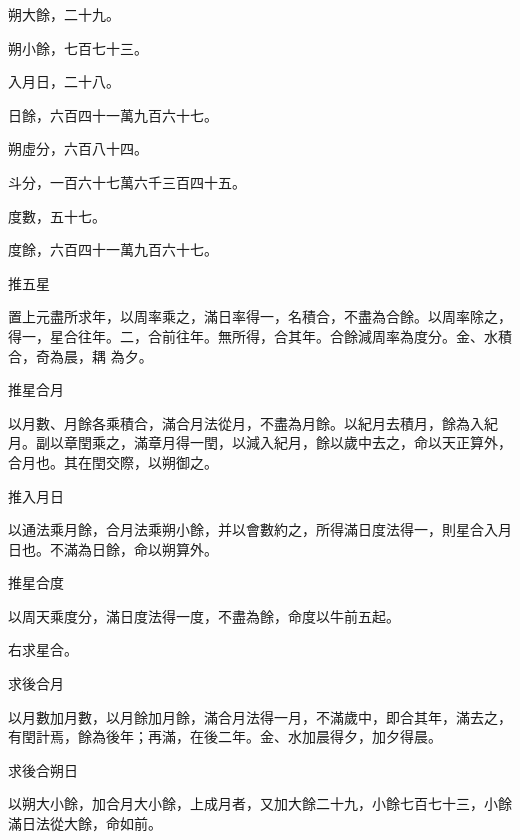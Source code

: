 \begin{pinyinscope}
 朔大餘，二十九。



 朔小餘，七百七十三。



 入月日，二十八。



 日餘，六百四十一萬九百六十七。



 朔虛分，六百八十四。



 斗分，一百六十七萬六千三百四十五。



 度數，五十七。



 度餘，六百四十一萬九百六十七。



 推五星



 置上元盡所求年，以周率乘之，滿日率得一，名積合，不盡為合餘。以周率除之，得一，星合往年。二，合前往年。無所得，合其年。合餘減周率為度分。金、水積合，奇為晨，耦
 為夕。



 推星合月



 以月數、月餘各乘積合，滿合月法從月，不盡為月餘。以紀月去積月，餘為入紀月。副以章閏乘之，滿章月得一閏，以減入紀月，餘以歲中去之，命以天正算外，合月也。其在閏交際，以朔御之。



 推入月日



 以通法乘月餘，合月法乘朔小餘，并以會數約之，所得滿日度法得一，則星合入月日也。不滿為日餘，命以朔算外。



 推星合度



 以周天乘度分，滿日度法得一度，不盡為餘，命度以牛前五起。



 右求星合。



 求後合月



 以月數加月數，以月餘加月餘，滿合月法得一月，不滿歲中，即合其年，滿去之，有閏計焉，餘為後年；再滿，在後二年。金、水加晨得夕，加夕得晨。



 求後合朔日



 以朔大小餘，加合月大小餘，上成月者，又加大餘二十九，小餘七百七十三，小餘滿日法從大餘，命如前。




\end{pinyinscope}
